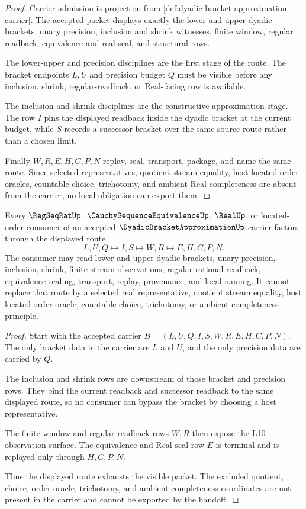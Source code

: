 \begin{proof}
Carrier admission is projection from \autoref{def:dyadic-bracket-approximation-carrier}. The accepted packet displays exactly the lower and upper dyadic brackets, unary precision, inclusion and shrink witnesses, finite window, regular readback, equivalence and real seal, and structural rows.

The lower-upper and precision disciplines are the first stage of the route. The bracket endpoints $L,U$ and precision budget $Q$ must be visible before any inclusion, shrink, regular-readback, or Real-facing row is available.

The inclusion and shrink disciplines are the constructive approximation stage. The row $I$ pins the displayed readback inside the dyadic bracket at the current budget, while $S$ records a successor bracket over the same source route rather than a chosen limit.

Finally $W,R,E,H,C,P,N$ replay, seal, transport, package, and name the same route. Since selected representatives, quotient stream equality, host located-order oracles, countable choice, trichotomy, and ambient Real completeness are absent from the carrier, no local obligation can export them.
\end{proof}

\begin{theorem}
\label{thm:dyadic-bracket-approximation-real-handoff}
Every $\RegSeqRatUp$, $\CauchySequenceEquivalenceUp$, $\RealUp$, or located-order consumer of an accepted $\DyadicBracketApproximationUp$ carrier factors through the displayed route
$$
L,U,Q \longmapsto I,S \longmapsto W,R \longmapsto E,H,C,P,N .
$$
The consumer may read lower and upper dyadic brackets, unary precision, inclusion, shrink, finite stream observations, regular rational readback, equivalence sealing, transport, replay, provenance, and local naming. It cannot replace that route by a selected real representative, quotient stream equality, host located-order oracle, countable choice, trichotomy, or ambient completeness principle.
\end{theorem}
\begin{proof}
Start with the accepted carrier $B=(L,U,Q,I,S,W,R,E,H,C,P,N)$. The only bracket data in the carrier are $L$ and $U$, and the only precision data are carried by $Q$.

The inclusion and shrink rows are downstream of those bracket and precision rows. They bind the current readback and successor readback to the same displayed route, so no consumer can bypass the bracket by choosing a host representative.

The finite-window and regular-readback rows $W,R$ then expose the L10 observation surface. The equivalence and Real seal row $E$ is terminal and is replayed only through $H,C,P,N$.

Thus the displayed route exhausts the visible packet. The excluded quotient, choice, order-oracle, trichotomy, and ambient-completeness coordinates are not present in the carrier and cannot be exported by the handoff.
\end{proof}

